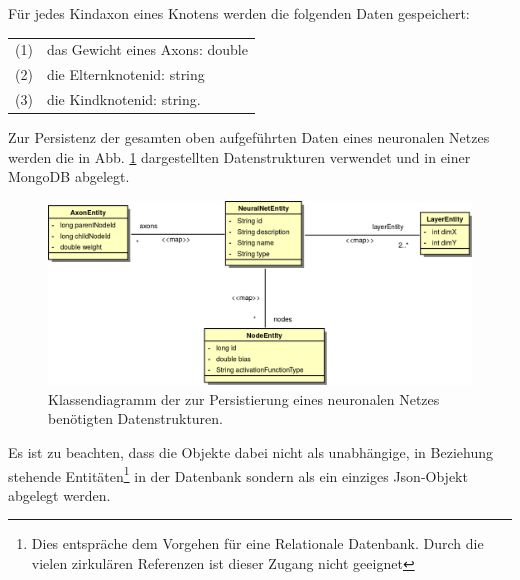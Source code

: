 Für jedes Kindaxon eines Knotens werden die folgenden Daten gespeichert: 

\begin{tabular}{cl}
(1) & das Gewicht eines Axons: double \\[0.2cm]
(2) & die Elternknotenid: string \\[0.2cm]
(3) & die Kindknotenid: string. \\[0.2cm]
\end{tabular}

Zur Persistenz der gesamten oben aufgeführten Daten eines neuronalen Netzes werden die in Abb. \ref{fig_dbClassdiagram} dargestellten Datenstrukturen verwendet und in einer MongoDB abgelegt. 
\begin{figure}[h]
\begin{center}
\includegraphics[width=\textwidth]{Abbildungen/UML/jan/datenBankKlassendiagramm.png}
\caption{Klassendiagramm der zur Persistierung eines neuronalen Netzes benötigten Datenstrukturen.}
\label{fig_dbClassdiagram}
\end{center}
\end{figure}
Es ist zu beachten, dass die Objekte dabei nicht als unabhängige, in Beziehung stehende Entitäten\footnote{Dies entspräche dem Vorgehen für eine Relationale Datenbank. Durch die vielen zirkulären Referenzen ist dieser Zugang nicht geeignet} in der Datenbank sondern als ein einziges Json-Objekt abgelegt werden. 
